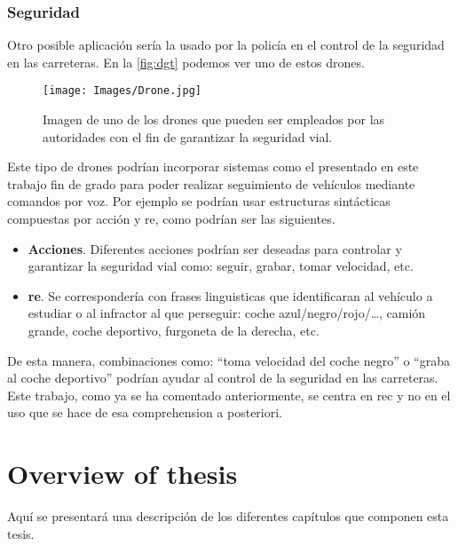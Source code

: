 \subsubsection{Seguridad}
Otro posible aplicación sería la usado por la policía en el control de la
seguridad en las carreteras. En la \vref{fig:dgt} podemos ver uno de estos
drones.

\begin{figure}[ht]
  \centering
  \texttt{[image: Images/Drone.jpg]}
  \caption[Drones empleados para la seguridad vial]{Imagen de uno de los drones
    que pueden ser empleados por las autoridades con el fin de garantizar la
    seguridad vial.}
  \label{fig:dgt}
\end{figure}

Este tipo de drones podrían incorporar sistemas como el presentado en este
trabajo fin de grado para poder realizar seguimiento de vehículos mediante
comandos por voz. Por ejemplo se podrían usar estructuras sintácticas
compuestas por acción y \gls{re}, como podrían ser las siguientes.

\begin{itemize}
  \item \textbf{Acciones}. Diferentes acciones podrían ser deseadas para
  controlar y garantizar la seguridad vial como: seguir, grabar, tomar
  velocidad, etc.
  \item \textbf{\gls*{re}}. Se correspondería con frases linguisticas que
  identificaran al vehículo a estudiar o al infractor al que perseguir: coche
  azul/negro/rojo/\ldots, camión grande, coche deportivo, furgoneta de la
  derecha, etc.
\end{itemize}

De esta manera, combinaciones como: ``toma velocidad del coche negro'' o
``graba al coche deportivo'' podrían ayudar al control de la seguridad en las
carreteras. Este trabajo, como ya se ha comentado anteriormente, se centra en
\gls{rec} y no en el uso que se hace de esa comprehension a posteriori.


\section{Overview of thesis}

Aquí se presentará una descripción de los diferentes capítulos que componen
esta tesis.

